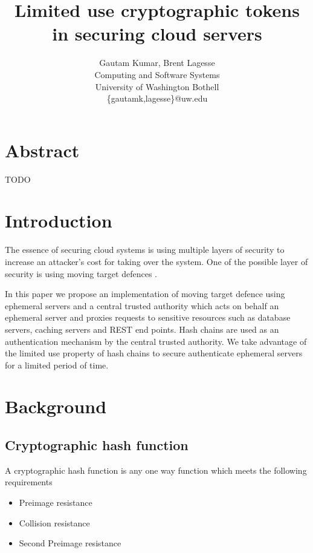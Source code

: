 \documentclass[12pt,conference]{IEEEtran}
\begin{document}
\title{Limited use cryptographic tokens in securing cloud servers}


\author{
{\rm Gautam Kumar, Brent Lagesse}\\
Computing and Software Systems\\
University of Washington Bothell\\
\{gautamk,lagesse\}@uw.edu
} %

\maketitle
\thispagestyle{empty}


\section*{Abstract}
TODO
\section*{Introduction}

The essence of securing cloud systems is using multiple layers \cite{panwar_layered_2011} of security to increase an attacker's cost for taking over the system. One of the possible layer of security is using moving target defences \cite{evans_effectiveness_2011}. 

In this paper we propose an implementation of moving target defence using ephemeral servers and a central trusted authority which acts on behalf an ephemeral server and proxies requests to sensitive resources such as database servers, caching servers and REST end points. Hash chains are used as an authentication mechanism by the central trusted authority. We take advantage of the limited use property of hash chains to secure authenticate ephemeral servers for a limited period of time.

\section*{Background}
\subsection*{Cryptographic hash function \cite{rogaway_cryptographic_2004}} 
A cryptographic hash function is any one way function which meets the following requirements 
\begin{itemize} 
\item Preimage resistance
\item Collision resistance
\item Second Preimage resistance
\end{itemize}
\end{document}
